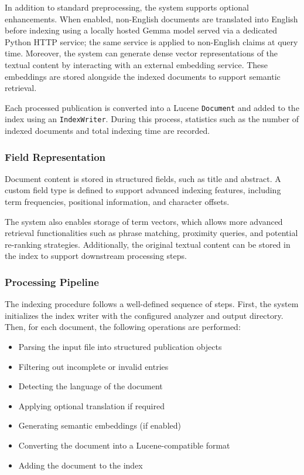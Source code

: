 In addition to standard preprocessing, the system supports optional enhancements. When enabled, non-English documents are translated into English before indexing using a locally hosted Gemma model served via a dedicated Python HTTP service; the same service is applied to non-English claims at query time. Moreover, the system can generate dense vector representations of the textual content by interacting with an external embedding service. These embeddings are stored alongside the indexed documents to support semantic retrieval.

Each processed publication is converted into a Lucene \texttt{Document} and added to the index using an \texttt{IndexWriter}. During this process, statistics such as the number of indexed documents and total indexing time are recorded.

\subsubsection{Field Representation}

Document content is stored in structured fields, such as title and abstract. A custom field type is defined to support advanced indexing features, including term frequencies, positional information, and character offsets.

The system also enables storage of term vectors, which allows more advanced retrieval functionalities such as phrase matching, proximity queries, and potential re-ranking strategies. Additionally, the original textual content can be stored in the index to support downstream processing steps.

\subsubsection{Processing Pipeline}

The indexing procedure follows a well-defined sequence of steps. First, the system initializes the index writer with the configured analyzer and output directory. Then, for each document, the following operations are performed:

\begin{itemize}
    \item Parsing the input file into structured publication objects
    \item Filtering out incomplete or invalid entries
    \item Detecting the language of the document
    \item Applying optional translation if required
    \item Generating semantic embeddings (if enabled)
    \item Converting the document into a Lucene-compatible format
    \item Adding the document to the index
\end{itemize}

